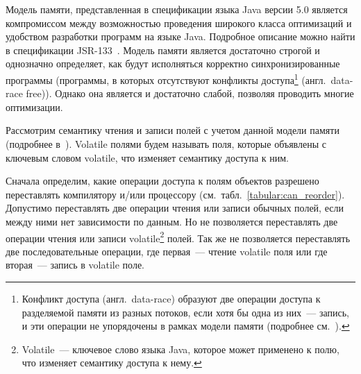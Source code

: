 \documentclass[14pt,titlepage]{extarticle}
\newcommand{\eng}[1]{{\English#1}}
\newcommand{\engdef}[1]{(англ.~\eng{#1})}
\newcommand{\java}{\eng{Java}\xspace}
\begin{document}
      Модель памяти, представленная в спецификации языка \java версии 5.0
      является компромиссом между возможностью проведения широкого класса
      оптимизаций и удобством разработки программ на языке \java. Подробное
      описание можно найти в спецификации JSR-133~\cite{jsr133}. Модель памяти
      является достаточно строгой и однозначно определяет, как будут
      исполняться корректно синхронизированные программы (программы, в которых
      отсутствуют конфликты доступа\footnote{
        Конфликт доступа \engdef{data-race} образуют две операции доступа к
        разделяемой памяти из разных потоков, если хотя бы одна из них~---
        запись, и эти операции не упорядочены в рамках модели памяти (подробнее
        см.~\cite[раздел~2.1]{manson_jmm}).
      } \engdef{data-race free}). Однако она является и достаточно слабой,
      позволяя проводить многие оптимизации.

      Рассмотрим семантику чтения и записи полей с учетом данной модели памяти
      (подробнее в~\cite{jsr133_cookbook}). \eng{Volatile} полями будем
      называть поля, которые объявлены с ключевым словом \eng{volatile}, что
      изменяет семантику доступа к ним.

      Сначала определим, какие операции доступа к полям объектов разрешено
      переставлять компилятору и/или процессору
      (см.~табл.~\ref{tabular:can_reorder}).
      Допустимо переставлять две операции чтения или записи обычных полей, если
      между ними нет зависимости по данным. Но не позволяется переставлять две
      операции чтения или записи \eng{volatile}\footnote{
        \eng{Volatile}~--- ключевое слово языка \java, которое может применено
        к полю, что изменяет семантику доступа к нему.
      } полей. Так же не позволяется
      переставлять две последовательные операции, где первая~--- чтение
      \eng{volatile} поля или где вторая~--- запись в \eng{volatile} поле.
\end{document}
